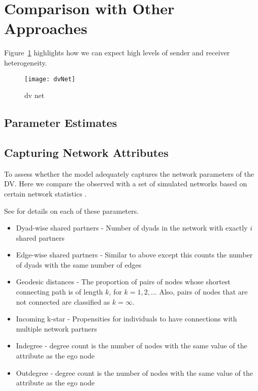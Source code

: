 \section{\textbf{Comparison with Other Approaches}}

\citet{ingold:2008}

\citet{ingold:fischer:2014}

\citet{ingold:leifeld:2014}

Figure~\ref{fig:dvNet} highlights how we can expect high levels of sender and receiver heterogeneity. 

\begin{figure}[ht]
	\centering
	\texttt{[image: dvNet]}
	\caption{dv net}
	\label{fig:dvNet}
\end{figure}

\citet{krivitsky:handcock:2015}

\subsection{Parameter Estimates}



\subsection{Capturing Network Attributes}

To assess whether the model adequately captures the network parameters of the DV. Here we compare the observed with a set of simulated networks based on certain network statistics \citep{hunter:etal:2008}. 

See \citet{morris:etal:2008} for details on each of these parameters. 

\begin{itemize}
\item Dyad-wise shared partners - Number of dyads in the network with exactly $i$ shared partners
\item Edge-wise shared partners - Similar to above except this counts the number of dyads with the same number of edges
\item Geodesic distances - The proportion of pairs of nodes whose shortest connecting path is of length $k$, for $k=1,2,\ldots$ Also, pairs of nodes that are not connected are classified as $k=\infty$.
\item Incoming k-star - Propensities for individuals to have connections with multiple network partners
\item Indegree - degree count is the number of nodes with the same value of the attribute as the ego node
\item Outdegree - degree count is the number of nodes with the same value of the attribute as the ego node
\end{itemize}

